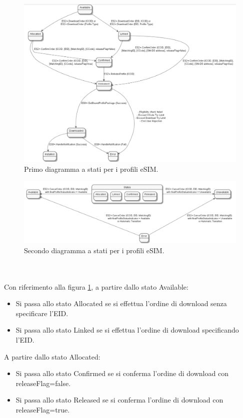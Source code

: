 \documentclass[10pt, oneside]{book}
\begin{document}
\begin{figure}
\includegraphics[width=\linewidth]{profile-states1.png}
\caption{Primo diagramma a stati per i profili eSIM.}
\label{fig:profile-states1}
\end{figure}
\begin{figure}
\includegraphics[width=\linewidth]{profile-states2.png}
\caption{Secondo diagramma a stati per i profili eSIM.}
\label{fig:profile-states2}
\end{figure}
\\
\\Con riferimento alla figura \ref{fig:profile-states1}, a partire dallo stato Available:
\begin{itemize}
\item Si passa allo stato Allocated se si effettua l'ordine di download senza specificare l'EID.
\item Si passa allo stato Linked se si effettua l'ordine di download specificando l'EID.
\end{itemize}
A partire dallo stato Allocated:
\begin{itemize}
\item Si passa allo stato Confirmed se si conferma l'ordine di download con releaseFlag=false.
\item Si passa allo stato Released se si conferma l'ordine di download con releaseFlag=true.
\end{itemize}
\end{document}
